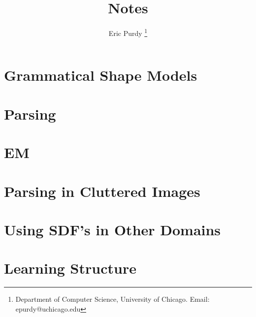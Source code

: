 \documentclass{article}
\title{Notes}
\author{Eric Purdy \footnote{Department of Computer Science, University of Chicago. Email: epurdy@uchicago.edu}}
\begin{document}
\maketitle

\section{Grammatical Shape Models}

\section{Parsing}


\section{EM}

\section{Parsing in Cluttered Images}

\section{Using SDF's in Other Domains}

\section{Learning Structure}

\end{document}
